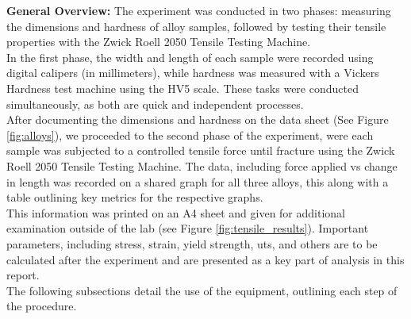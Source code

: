 \documentclass{article}
\begin{document}
\textbf{General Overview:}
The experiment was conducted in two phases: measuring the dimensions and hardness of alloy samples, followed by testing their tensile properties with the Zwick Roell 2050 Tensile Testing Machine. \\[8pt]
In the first phase, the width and length of each sample were recorded using digital calipers (in millimeters), while hardness was measured with a Vickers Hardness test machine using the HV5 scale. These tasks were conducted simultaneously, as both are quick and independent processes.\\[8pt]
After documenting the dimensions and hardness on the data sheet (See Figure \ref{fig:alloys}), we proceeded to the second phase of the experiment, were each sample was subjected to a controlled tensile force until fracture using the Zwick Roell 2050 Tensile Testing Machine. The data, including force applied vs change in length was recorded on a shared graph for all three alloys, this along with a table outlining key metrics for the respective graphs.\\[8pt] 
This information was printed on an A4 sheet and given for additional examination outside of the lab (see Figure \ref{fig:tensile_results}). Important parameters, including stress, strain, yield strength, uts, and others are to be calculated after the experiment and are presented as a key part of analysis in this report.\\[8pt]
The following subsections detail the use of the equipment, outlining each step of the procedure.\\
\newpage
\end{document}
